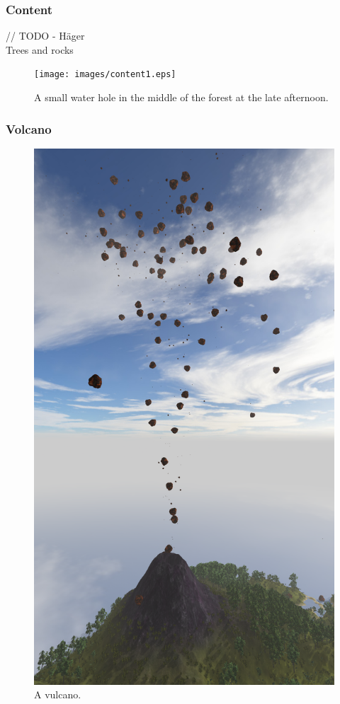 \subsubsection{Content}
// TODO - Häger \\
Trees and rocks 
\begin{figure}[H]
  \centering
  \texttt{[image: images/content1.eps]}
  \caption{A small water hole in the middle of the forest at the late afternoon.}
  \label{fig:water_hole}
\end{figure}%

\subsubsection{Volcano}
\begin{figure}[H]
  \centering
  \includegraphics[width=0.8\linewidth]{images/volcano.png}
  \caption{A vulcano.}
  \label{fig:vulcano}
\end{figure}%
